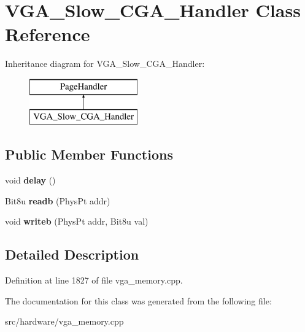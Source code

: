 \hypertarget{classVGA__Slow__CGA__Handler}{\section{V\-G\-A\-\_\-\-Slow\-\_\-\-C\-G\-A\-\_\-\-Handler Class Reference}
\label{classVGA__Slow__CGA__Handler}
}
Inheritance diagram for V\-G\-A\-\_\-\-Slow\-\_\-\-C\-G\-A\-\_\-\-Handler\-:\begin{figure}[H]
\begin{center}
\leavevmode
\includegraphics[height=2.000000cm]{classVGA__Slow__CGA__Handler}
\end{center}
\end{figure}
\subsection*{Public Member Functions}
\begin{DoxyCompactItemize}
\item 
\hypertarget{classVGA__Slow__CGA__Handler_af8dd584b1fbb765acffe039b47f21181}{void {\bfseries delay} ()}\label{classVGA__Slow__CGA__Handler_af8dd584b1fbb765acffe039b47f21181}

\item 
\hypertarget{classVGA__Slow__CGA__Handler_a013a051c8b1dd2bc43ee85988988c077}{Bit8u {\bfseries readb} (Phys\-Pt addr)}\label{classVGA__Slow__CGA__Handler_a013a051c8b1dd2bc43ee85988988c077}

\item 
\hypertarget{classVGA__Slow__CGA__Handler_a7d713dfb7609910d40e7eed87b6002ae}{void {\bfseries writeb} (Phys\-Pt addr, Bit8u val)}\label{classVGA__Slow__CGA__Handler_a7d713dfb7609910d40e7eed87b6002ae}

\end{DoxyCompactItemize}


\subsection{Detailed Description}


Definition at line 1827 of file vga\-\_\-memory.\-cpp.



The documentation for this class was generated from the following file\-:\begin{DoxyCompactItemize}
\item 
src/hardware/vga\-\_\-memory.\-cpp\end{DoxyCompactItemize}
